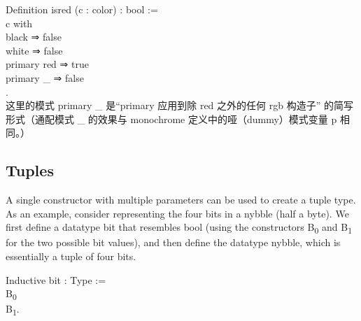 \documentclass[utf8]{ctexart}
\begin{document}
{Definition} {isred} ({c} : {color}) : {bool} :=\\
\hspace*{0.333em}\hspace*{0.333em}{match} {c} {with}\\
\hspace*{0.333em}\hspace*{0.333em}\textbar{} {black} ⇒ {false}\\
\hspace*{0.333em}\hspace*{0.333em}\textbar{} {white} ⇒ {false}\\
\hspace*{0.333em}\hspace*{0.333em}\textbar{} {primary} {red} ⇒ {true}\\
\hspace*{0.333em}\hspace*{0.333em}\textbar{} {primary} {\_} ⇒ {false}\\
\hspace*{0.333em}\hspace*{0.333em}{end}.\\

这里的模式 {{primary}} {{\_}} 是``{{primary}} 应用到除 {{red}}
之外的任何 {{rgb}} 构造子'' 的简写形式（通配模式 {{\_}} 的效果与
{{monochrome}} 定义中的哑（dummy）模式变量 {{p}} 相同。）

\protect\hypertarget{lab28}{}{}

\hypertarget{tuples}{%
\subsection{Tuples}\label{tuples}}

A single constructor with multiple parameters can be used to create a
tuple type. As an example, consider representing the four bits in a
nybble (half a byte). We first define a datatype {{bit}} that resembles
{{bool}} (using the constructors {{B\textsubscript{0}}} and
{{B\textsubscript{1}}} for the two possible bit values), and then define
the datatype {{nybble}}, which is essentially a tuple of four bits.

{Inductive} {bit} : {Type} :=\\
\hspace*{0.333em}\hspace*{0.333em}\textbar{} {B\textsubscript{0}}\\
\hspace*{0.333em}\hspace*{0.333em}\textbar{} {B\textsubscript{1}}.\\
\end{document}
